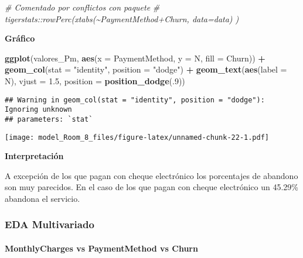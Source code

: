 \documentclass[
]{article}
\newenvironment{Shaded}{\begin{snugshade}}{\end{snugshade}}
\newcommand{\AttributeTok}[1]{\textcolor[rgb]{0.13,0.29,0.53}{#1}}
\newcommand{\CommentTok}[1]{\textcolor[rgb]{0.56,0.35,0.01}{\textit{#1}}}
\newcommand{\DecValTok}[1]{\textcolor[rgb]{0.00,0.00,0.81}{#1}}
\newcommand{\FloatTok}[1]{\textcolor[rgb]{0.00,0.00,0.81}{#1}}
\newcommand{\FunctionTok}[1]{\textcolor[rgb]{0.13,0.29,0.53}{\textbf{#1}}}
\newcommand{\NormalTok}[1]{#1}
\newcommand{\SpecialCharTok}[1]{\textcolor[rgb]{0.81,0.36,0.00}{\textbf{#1}}}
\newcommand{\StringTok}[1]{\textcolor[rgb]{0.31,0.60,0.02}{#1}}
\begin{document}
\begin{Shaded}
\begin{Highlighting}[]
\CommentTok{\# Comentado por conflictos con paquete}
\CommentTok{\# tigerstats::rowPerc(xtabs(\textasciitilde{}PaymentMethod+Churn, data=data) )}
\end{Highlighting}
\end{Shaded}

\textbf{Gráfico}

\begin{Shaded}
\begin{Highlighting}[]
\FunctionTok{ggplot}\NormalTok{(valores\_Pm, }\FunctionTok{aes}\NormalTok{(}\AttributeTok{x =}\NormalTok{ PaymentMethod, }\AttributeTok{y =}\NormalTok{ N, }\AttributeTok{fill =}\NormalTok{ Churn)) }\SpecialCharTok{+}
  \FunctionTok{geom\_col}\NormalTok{(}\AttributeTok{stat =} \StringTok{"identity"}\NormalTok{, }\AttributeTok{position =} \StringTok{"dodge"}\NormalTok{) }\SpecialCharTok{+}
  \FunctionTok{geom\_text}\NormalTok{(}\FunctionTok{aes}\NormalTok{(}\AttributeTok{label =}\NormalTok{ N), }\AttributeTok{vjust =} \FloatTok{1.5}\NormalTok{,}
            \AttributeTok{position =} \FunctionTok{position\_dodge}\NormalTok{(.}\DecValTok{9}\NormalTok{))}
\end{Highlighting}
\end{Shaded}

\begin{verbatim}
## Warning in geom_col(stat = "identity", position = "dodge"): Ignoring unknown
## parameters: `stat`
\end{verbatim}

\texttt{[image: model\_Room\_8\_files/figure-latex/unnamed-chunk-22-1.pdf]}

\textbf{Interpretación}

A excepción de los que pagan con cheque electrónico los porcentajes de
abandono son muy parecidos. En el caso de los que pagan con cheque
electrónico un 45.29\% abandona el servicio.

\hypertarget{eda-multivariado}{%
\subsubsection{EDA Multivariado}\label{eda-multivariado}}

\hypertarget{monthlycharges-vs-paymentmethod-vs-churn}{%
\paragraph{MonthlyCharges vs PaymentMethod vs
Churn}\label{monthlycharges-vs-paymentmethod-vs-churn}}
\end{document}
